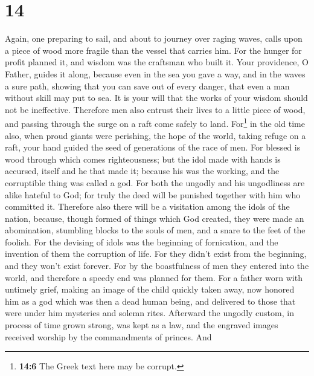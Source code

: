 \hypertarget{section-13}{%
\section{14}\label{section-13}}

 Again, one preparing to sail, and about to journey over
raging waves, calls upon a piece of wood more fragile than the vessel
that carries him.  For the hunger for profit planned it,
and wisdom was the craftsman who built it.  Your
providence, O Father, guides it along, because even in the sea you gave
a way, and in the waves a sure path,  showing that you can
save out of every danger, that even a man without skill may put to sea.
 It is your will that the works of your wisdom should not
be ineffective. Therefore men also entrust their lives to a little piece
of wood, and passing through the surge on a raft come safely to land.
 For\footnote{\textbf{14:6} The Greek text here may be
  corrupt.} in the old time also, when proud giants were perishing, the
hope of the world, taking refuge on a raft, your hand guided the seed of
generations of the race of men.  For blessed is wood
through which comes righteousness;  but the idol made with
hands is accursed, itself and he that made it; because his was the
working, and the corruptible thing was called a god.  For
both the ungodly and his ungodliness are alike hateful to God;
 for truly the deed will be punished together with him
who committed it.  Therefore also there will be a
visitation among the idols of the nation, because, though formed of
things which God created, they were made an abomination, stumbling
blocks to the souls of men, and a snare to the feet of the foolish.
 For the devising of idols was the beginning of
fornication, and the invention of them the corruption of life.
 For they didn't exist from the beginning, and they won't
exist forever.  For by the boastfulness of men they
entered into the world, and therefore a speedy end was planned for them.
 For a father worn with untimely grief, making an image
of the child quickly taken away, now honored him as a god which was then
a dead human being, and delivered to those that were under him mysteries
and solemn rites.  Afterward the ungodly custom, in
process of time grown strong, was kept as a law, and the engraved images
received worship by the commandments of princes.  And
